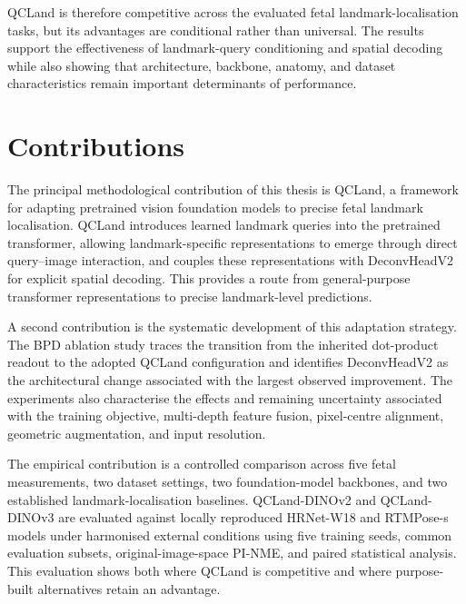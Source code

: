 QCLand is therefore competitive across the evaluated fetal
landmark-localisation tasks, but its advantages are conditional rather
than universal. The results support the effectiveness of
landmark-query conditioning and spatial decoding while also showing
that architecture, backbone, anatomy, and dataset characteristics
remain important determinants of performance.



\section{Contributions}
\label{sec:conclusion-contributions}

The principal methodological contribution of this thesis is QCLand,
a framework for adapting pretrained vision foundation models to
precise fetal landmark localisation. QCLand introduces learned
landmark queries into the pretrained transformer, allowing
landmark-specific representations to emerge through direct
query--image interaction, and couples these representations with
DeconvHeadV2 for explicit spatial decoding. This provides a route
from general-purpose transformer representations to precise
landmark-level predictions.

A second contribution is the systematic development of this
adaptation strategy. The BPD ablation study traces the transition
from the inherited dot-product readout to the adopted QCLand
configuration and identifies DeconvHeadV2 as the architectural change
associated with the largest observed improvement. The experiments
also characterise the effects and remaining uncertainty associated
with the training objective, multi-depth feature fusion,
pixel-centre alignment, geometric augmentation, and input resolution.

The empirical contribution is a controlled comparison across five
fetal measurements, two dataset settings, two foundation-model
backbones, and two established landmark-localisation baselines.
QCLand-DINOv2 and QCLand-DINOv3 are evaluated against locally
reproduced HRNet-W18 and RTMPose-s models under harmonised external
conditions using five training seeds, common evaluation subsets,
original-image-space PI-NME, and paired statistical analysis. This
evaluation shows both where QCLand is competitive and where
purpose-built alternatives retain an advantage.


